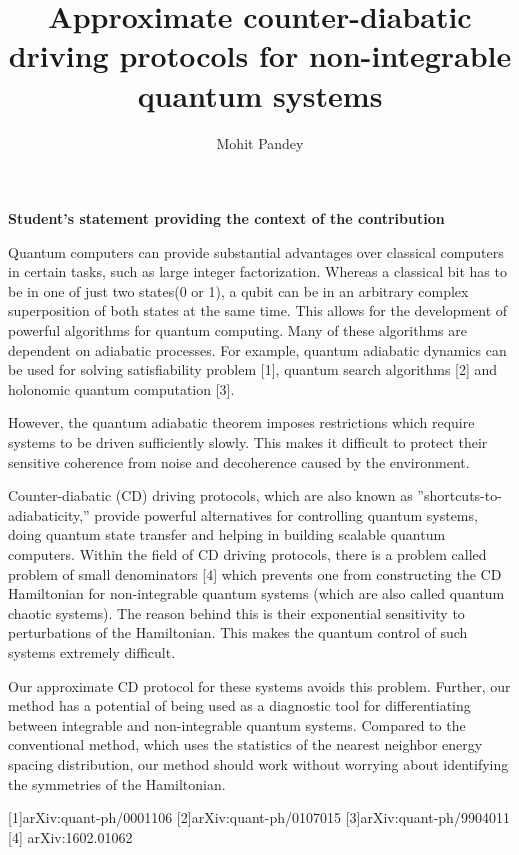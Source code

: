 \documentclass[11pt,a4paper]{article}
\author{Mohit Pandey}
\title{Approximate counter-diabatic driving protocols for non-integrable quantum systems  }
\begin{document}
\maketitle
\textbf{Student's statement  providing the context of the contribution}


Quantum computers can provide substantial advantages over classical computers in certain tasks, such as large integer factorization. Whereas a classical bit has to be in one of just two states(0 or 1), a qubit can be in an arbitrary complex superposition of both states at the same time. This allows for the development of powerful algorithms for quantum computing.
Many of these algorithms are dependent on adiabatic processes. For example, quantum adiabatic dynamics can be used for solving satisfiability problem [1], quantum search algorithms [2] and holonomic quantum computation [3]. 

However, the quantum adiabatic theorem imposes restrictions which require systems to be driven sufficiently slowly. This makes it difficult to protect their sensitive coherence from noise and decoherence caused by the environment.


Counter-diabatic (CD) driving protocols, which are also known as ”shortcuts-to-adiabaticity,” provide powerful alternatives for controlling quantum systems, doing quantum state transfer and helping in building scalable quantum computers. Within the field of CD driving protocols, there is a problem called problem of small denominators  [4] which prevents one from constructing the CD Hamiltonian for non-integrable quantum systems (which are also called quantum chaotic systems). The reason behind this is their exponential sensitivity to perturbations of the Hamiltonian. This makes the quantum control  of such systems extremely difficult.

Our approximate CD protocol for these systems avoids this problem. Further, our method has a potential of being used as a diagnostic tool for differentiating between integrable and non-integrable quantum systems. Compared to the conventional method, which uses the statistics of the nearest neighbor energy spacing distribution, our method should work without worrying about identifying the symmetries of the Hamiltonian. 

[1]arXiv:quant-ph/0001106
[2]arXiv:quant-ph/0107015
[3]arXiv:quant-ph/9904011
[4]	arXiv:1602.01062
\end{document}
